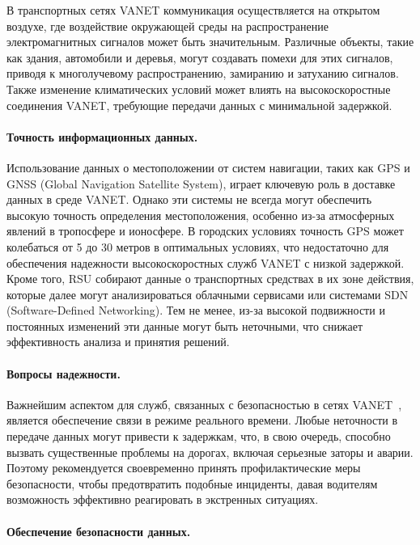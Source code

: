 В транспортных сетях VANET коммуникация осуществляется на открытом воздухе, где воздействие окружающей среды на распространение электромагнитных сигналов может быть значительным. Различные объекты, такие как здания, автомобили и деревья, могут создавать помехи для этих сигналов, приводя к многолучевому распространению, замиранию и затуханию сигналов. Также изменение климатических условий может влиять на высокоскоростные соединения VANET, требующие передачи данных с минимальной задержкой.

\paragraph{Точность информационных данных.}

Использование данных о местоположении от систем навигации, таких как GPS и GNSS (Global Navigation Satellite System), играет ключевую роль в доставке данных в среде VANET. Однако эти системы не всегда могут обеспечить высокую точность определения местоположения, особенно из-за атмосферных явлений в тропосфере и ионосфере. В городских условиях точность GPS может колебаться от 5 до 30 метров в оптимальных условиях, что недостаточно для обеспечения надежности высокоскоростных служб VANET с низкой задержкой. Кроме того, RSU собирают данные о транспортных средствах в их зоне действия, которые далее могут анализироваться облачными сервисами или системами  SDN (Software-Defined Networking). Тем не менее, из-за высокой подвижности и постоянных изменений эти данные могут быть неточными, что снижает эффективность анализа и принятия решений.

\paragraph{Вопросы надежности.}

Важнейшим аспектом для служб, связанных с безопасностью в сетях VANET~\cite{hahn2019security}, является обеспечение связи в режиме реального времени. Любые неточности в передаче данных могут привести к задержкам, что, в свою очередь, способно вызвать существенные проблемы на дорогах, включая серьезные заторы и аварии. Поэтому рекомендуется своевременно принять профилактические меры безопасности, чтобы предотвратить подобные инциденты, давая водителям возможность эффективно реагировать в экстренных ситуациях.

\paragraph{Обеспечение безопасности данных.}

